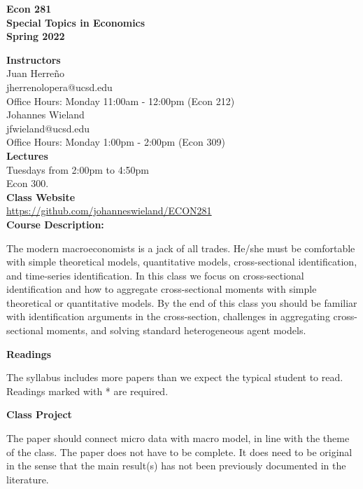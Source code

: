 \documentclass [12pt]{article}
\begin{document}
\begin{center}
\textbf{Econ 281\\
Special Topics in Economics\\
Spring 2022}
\end{center}


\noindent \textbf{Instructors} \\
Juan Herre\~no\\ 
jherrenolopera@ucsd.edu\\
Office Hours: Monday 11:00am - 12:00pm (Econ 212)\\

\noindent Johannes Wieland\\ 
jfwieland@ucsd.edu\\
Office Hours: Monday 1:00pm - 2:00pm  (Econ 309)\\


\noindent \textbf{Lectures} \\
Tuesdays from 2:00pm to 4:50pm \\
Econ 300.\\

\noindent \textbf{Class Website} \\
\href{https://github.com/johanneswieland/ECON281}{https://github.com/johanneswieland/ECON281} \\


\noindent \textbf{Course Description:} 

The modern macroeconomists is a jack of all trades. He/she must be comfortable with simple theoretical models, quantitative models, cross-sectional identification, and time-series identification. In this class we focus on cross-sectional identification and how to aggregate cross-sectional moments with simple theoretical or quantitative models. By the end of this class you should be familiar with identification arguments in the cross-section, challenges in aggregating cross-sectional moments, and solving standard heterogeneous agent models.



\noindent  \textbf{Readings}



\noindent The syllabus includes more papers than we expect the typical student to read. Readings marked with * are required.


\noindent  \textbf{Class Project}

The paper should connect micro data with macro model, in line with the theme of the class. The paper does not have to be complete. It does need to be original in the sense that the main result(s) has not been previously documented in the literature.
\end{document}
